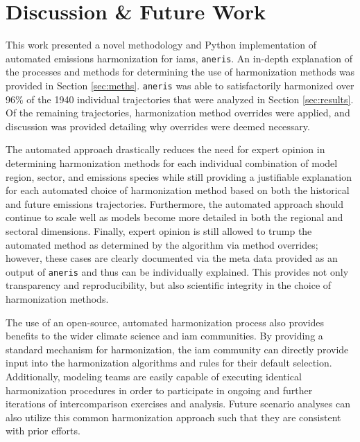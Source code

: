 \documentclass[review]{elsarticle}
\newcommand{\code}[1]{\lstinline[basicstyle=\ttfamily\color{black}]|#1|}
\begin{document}
\section{Discussion \& Future Work}\label{sec:future}

This work presented a novel methodology and Python implementation of automated
emissions harmonization for \glspl{iam}, \code{aneris}. An in-depth explanation
of the processes and methods for determining the use of harmonization methods
was provided in Section \ref{sec:meths}. \code{aneris} was able to
satisfactorily harmonized over 96\% of the 1940 individual trajectories that
were analyzed in Section \ref{sec:results}. Of the remaining trajectories,
harmonization method overrides were applied, and  discussion was provided
detailing why overrides were deemed necessary.

The automated approach drastically reduces the need for expert opinion in
determining harmonization methods for each individual combination of model
region, sector, and emissions species while still providing a justifiable
explanation for each automated choice of harmonization method based on both the
historical and future emissions trajectories. Furthermore, the automated
approach should continue to scale well as models become more detailed in both the
regional and sectoral dimensions. Finally, expert opinion is still allowed to
trump the automated method as determined by the algorithm via method overrides;
however, these cases are clearly documented via the meta data provided as an
output of \code{aneris} and thus can be individually explained. This provides
not only transparency and reproducibility, but also scientific integrity in the
choice of harmonization methods.

The use of an open-source, automated harmonization process also provides
benefits to the wider climate science and \gls{iam} communities. By providing a
standard mechanism for harmonization, the \gls{iam} community can directly provide
input into the harmonization algorithms and rules for their default
selection. Additionally, modeling teams are easily capable of executing
identical harmonization procedures in order to participate in ongoing and
further iterations of intercomparison exercises and analysis. Future scenario
analyses can also utilize this common harmonization approach such that they are
consistent with prior efforts.
\end{document}
